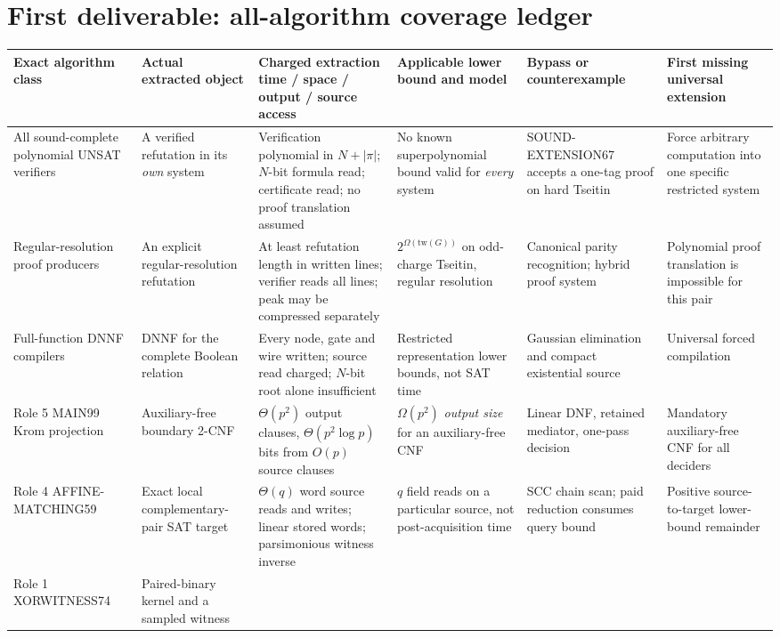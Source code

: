 \documentclass[11pt]{article}
\begin{document}
\section{First deliverable: all-algorithm coverage ledger}
\scriptsize
\begin{longtable}{p{.12\linewidth}p{.145\linewidth}p{.245\linewidth}p{.15\linewidth}p{.14\linewidth}p{.13\linewidth}}
\toprule
Exact algorithm class & Actual extracted object & Charged extraction time / space / output / source access & Applicable lower bound and model & Bypass or counterexample & First missing universal extension\\\midrule\endhead
All sound-complete polynomial UNSAT verifiers &
A verified refutation in its \emph{own} system &
Verification polynomial in $N+|\pi|$; $N$-bit formula read; certificate read; no proof translation assumed &
No known superpolynomial bound valid for \emph{every} system &
SOUND-EXTENSION67 accepts a one-tag proof on hard Tseitin &
Force arbitrary computation into one specific restricted system\\
Regular-resolution proof producers &
An explicit regular-resolution refutation &
At least refutation length in written lines; verifier reads all lines; peak may be compressed separately &
$2^{\Omega(\mathrm{tw}(G))}$ on odd-charge Tseitin, regular resolution &
Canonical parity recognition; hybrid proof system &
Polynomial proof translation is impossible for this pair\\
Full-function DNNF compilers &
DNNF for the complete Boolean relation &
Every node, gate and wire written; source read charged; $N$-bit root alone insufficient &
Restricted representation lower bounds, not SAT time &
Gaussian elimination and compact existential source &
Universal forced compilation\\
Role 5 MAIN99 Krom projection &
Auxiliary-free boundary 2-CNF &
$\Theta(p^2)$ output clauses, $\Theta(p^2\log p)$ bits from $O(p)$ source clauses &
$\Omega(p^2)$ \emph{output size} for an auxiliary-free CNF &
Linear DNF, retained mediator, one-pass decision &
Mandatory auxiliary-free CNF for all deciders\\
Role 4 AFFINE-MATCHING59 &
Exact local complementary-pair SAT target &
$\Theta(q)$ word source reads and writes; linear stored words; parsimonious witness inverse &
$q$ field reads on a particular source, not post-acquisition time &
SCC chain scan; paid reduction consumes query bound &
Positive source-to-target lower-bound remainder\\
Role 1 XORWITNESS74 &
Paired-binary kernel and a sampled witness &

\end{longtable}
\end{document}
